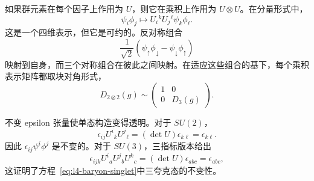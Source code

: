 如果群元素在每个因子上作用为 \(U\)，则它在乘积上作用为 \(U\otimes U\)。在分量形式中，
\begin{equation}
\psi_i\phi_j
\longmapsto
U_i{}^kU_j{}^\ell\psi_k\phi_\ell.
\label{eq:l4-product-action}
\end{equation}
这是一个四维表示，但它是可约的。反对称组合
\begin{equation}
\frac{1}{\sqrt2}
(\psi_\uparrow\phi_\downarrow
-\psi_\downarrow\phi_\uparrow)
\end{equation}
映射到自身，而三个对称组合在彼此之间映射。在适应这些组合的基下，每个乘积表示矩阵都取块对角形式，
\begin{equation}
D_{2\otimes2}(g)
\sim
\begin{pmatrix}
1&0\\
0&D_3(g)
\end{pmatrix}.
\label{eq:l4-spin-block-diagonal}
\end{equation}

\begin{classroomqa}
\end{classroomqa}

\begin{classroomqa}
\end{classroomqa}

不变 epsilon 张量使单态构造变得透明。对于
\(SU(2)\)，
\begin{equation}
\epsilon_{ij}U^i{}_kU^j{}_\ell
=(\det U)\epsilon_{k\ell}
=\epsilon_{k\ell}.
\end{equation}
因此 \(\epsilon_{ij}\psi^i\phi^j\) 是不变的。对于 \(SU(3)\)，三指标版本给出
\begin{equation}
\epsilon_{ijk}U^i{}_aU^j{}_bU^k{}_c
=(\det U)\epsilon_{abc}
=\epsilon_{abc},
\end{equation}
这证明了方程~\eqref{eq:l4-baryon-singlet}中三夸克态的不变性。

